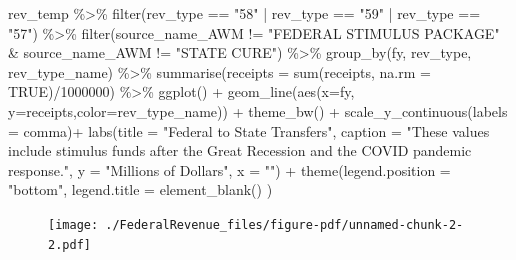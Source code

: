 \documentclass[
  letterpaper,
  DIV=11,
  numbers=noendperiod]{scrreport}
\newenvironment{Shaded}{\begin{snugshade}}{\end{snugshade}}
\newcommand{\AttributeTok}[1]{\textcolor[rgb]{0.40,0.45,0.13}{#1}}
\newcommand{\ConstantTok}[1]{\textcolor[rgb]{0.56,0.35,0.01}{#1}}
\newcommand{\DecValTok}[1]{\textcolor[rgb]{0.68,0.00,0.00}{#1}}
\newcommand{\FunctionTok}[1]{\textcolor[rgb]{0.28,0.35,0.67}{#1}}
\newcommand{\NormalTok}[1]{\textcolor[rgb]{0.00,0.23,0.31}{#1}}
\newcommand{\SpecialCharTok}[1]{\textcolor[rgb]{0.37,0.37,0.37}{#1}}
\newcommand{\StringTok}[1]{\textcolor[rgb]{0.13,0.47,0.30}{#1}}
\begin{document}
\begin{Shaded}
\begin{Highlighting}[]
\NormalTok{rev\_temp }\SpecialCharTok{\%\textgreater{}\%} 
  \FunctionTok{filter}\NormalTok{(rev\_type }\SpecialCharTok{==} \StringTok{"58"} \SpecialCharTok{|}\NormalTok{ rev\_type }\SpecialCharTok{==} \StringTok{"59"} \SpecialCharTok{|}\NormalTok{ rev\_type }\SpecialCharTok{==} \StringTok{"57"}\NormalTok{) }\SpecialCharTok{\%\textgreater{}\%} 
  \FunctionTok{filter}\NormalTok{(source\_name\_AWM }\SpecialCharTok{!=} \StringTok{"FEDERAL STIMULUS PACKAGE"} \SpecialCharTok{\&}\NormalTok{ source\_name\_AWM }\SpecialCharTok{!=} \StringTok{"STATE CURE"}\NormalTok{) }\SpecialCharTok{\%\textgreater{}\%}
  \FunctionTok{group\_by}\NormalTok{(fy, rev\_type, rev\_type\_name) }\SpecialCharTok{\%\textgreater{}\%} 
  \FunctionTok{summarise}\NormalTok{(}\AttributeTok{receipts =} \FunctionTok{sum}\NormalTok{(receipts, }\AttributeTok{na.rm =} \ConstantTok{TRUE}\NormalTok{)}\SpecialCharTok{/}\DecValTok{1000000}\NormalTok{) }\SpecialCharTok{\%\textgreater{}\%} 
  \FunctionTok{ggplot}\NormalTok{() }\SpecialCharTok{+}
  \FunctionTok{geom\_line}\NormalTok{(}\FunctionTok{aes}\NormalTok{(}\AttributeTok{x=}\NormalTok{fy, }\AttributeTok{y=}\NormalTok{receipts,}\AttributeTok{color=}\NormalTok{rev\_type\_name)) }\SpecialCharTok{+}
      \FunctionTok{theme\_bw}\NormalTok{() }\SpecialCharTok{+}
  \FunctionTok{scale\_y\_continuous}\NormalTok{(}\AttributeTok{labels =}\NormalTok{ comma)}\SpecialCharTok{+}
  \FunctionTok{labs}\NormalTok{(}\AttributeTok{title =} \StringTok{"Federal to State Transfers"}\NormalTok{, }
       \AttributeTok{caption =} \StringTok{"These values include stimulus funds after the Great Recession and the COVID pandemic response."}\NormalTok{,}
       \AttributeTok{y =} \StringTok{"Millions of Dollars"}\NormalTok{, }\AttributeTok{x =} \StringTok{""}\NormalTok{) }\SpecialCharTok{+} 
  \FunctionTok{theme}\NormalTok{(}\AttributeTok{legend.position =} \StringTok{"bottom"}\NormalTok{, }\AttributeTok{legend.title =} \FunctionTok{element\_blank}\NormalTok{()  )}
\end{Highlighting}
\end{Shaded}

\begin{figure}[H]

{\centering \texttt{[image: ./FederalRevenue\_files/figure-pdf/unnamed-chunk-2-2.pdf]}

}

\end{figure}
\end{document}
